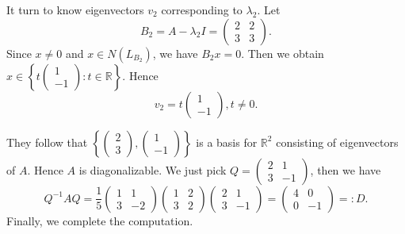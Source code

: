 \begin{Exercise}
\begin{enumerate}[(a)]
\begin{solution}
			It turn to know eigenvectors $v_2$ corresponding to $\lambda_2$. Let
			$$
			B_2 = A-\lambda_2 I = \begin{pmatrix}
			2 & 2 \\
			3 & 3
			\end{pmatrix}.
			$$ 
			Since $x\neq 0$ and $x\in N(L_{B_2})$, we have $B_2 x = 0$. Then we obtain $x \in \left\{t\begin{pmatrix}
			1 \\
			-1
			\end{pmatrix}:t\in\mathbb{R}\right\}$. Hence
			$$
			v_2 = t\begin{pmatrix}
			1 \\
			-1
			\end{pmatrix}, t\neq 0.
			$$
			
			They follow that $\left\{\begin{pmatrix}
			2 \\
			3
			\end{pmatrix},\begin{pmatrix}
			1 \\
			-1
			\end{pmatrix}\right\}
			$ is a basis for $\mathbb{R}^2$ consisting of eigenvectors of $A$. Hence $A$ is diagonalizable. We just pick $Q = \begin{pmatrix}
			2 & 1 \\
			3 & -1
			\end{pmatrix}$, then we have
			$$
			Q^{-1} A Q = \frac{1}{5}\begin{pmatrix}
			1 & 1 \\
			3 & -2
			\end{pmatrix}\begin{pmatrix}
			1 & 2 \\
			3 & 2
			\end{pmatrix}\begin{pmatrix}
			2 & 1 \\
			3 & -1
			\end{pmatrix} = \begin{pmatrix}
			4 & 0 \\
			0 & -1
			\end{pmatrix} =: D.
			$$
			Finally, we complete the computation.
		\end{solution}
	\end{enumerate}
\end{Exercise}